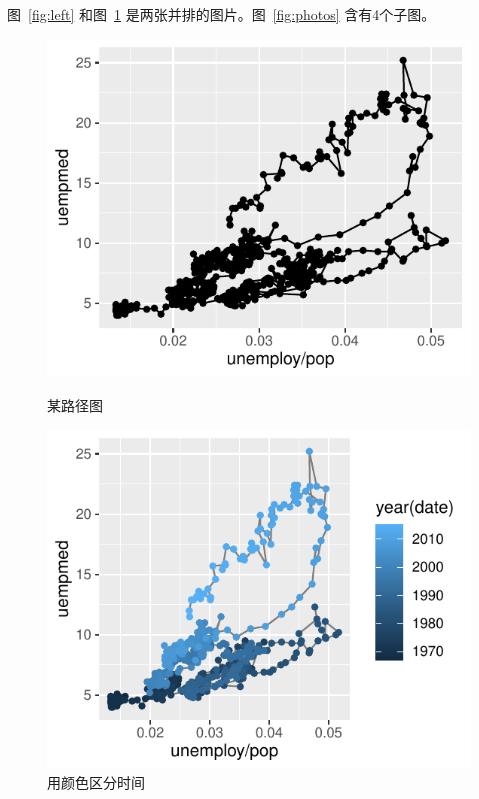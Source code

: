\documentclass[zihao = -4, linespread = 1.5]{ctexart}
\begin{document}
图~\ref{fig:left} 和图~\ref{fig:right} 是两张并排的图片。图~\ref{fig:photos} 含有4个子图。
\begin{figure}[htbp]
\centering
\begin{minipage}[t]{0.48\textwidth}
\centering
  \includegraphics[width=\textwidth]{picture/left.pdf}
  \caption{某路径图}
  \label{fig:left} %

\end{minipage}
\begin{minipage}[t]{0.48\textwidth}
\centering
  \includegraphics[width=\textwidth]{picture/right.pdf}
  \caption{用颜色区分时间}
  \label{fig:right}
\end{minipage}
\end{figure}
\end{document}
